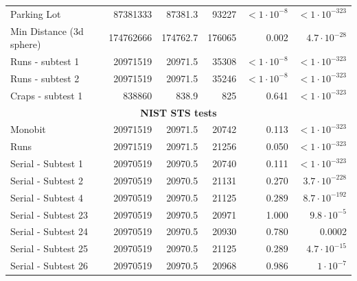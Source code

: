 \documentclass[
	digital,    %
	oneside,
	color,
	11pt,
	nocover,
	notable,
	nolof,
	nolot,
]{fithesis3}
\newcommand{\rd}{\cellcolor{red!40}}
\theoremstyle{definition}
\theoremstyle{remark}
\begin{document}
\begin{table}[H]
\begin{nomar}
{\begin{tabular}{@{}lrrrrr@{}}
Parking Lot                    & 87381333          & 87381.3       & 93227         & $<1\cdot 10^{-8}$  \rd & $<1\cdot 10^{-323}$   \rd \\
Min Distance (3d sphere)       & 174762666         & 174762.7      & 176065        & 0.002                  & $4.7 \cdot 10^{-28}$  \rd \\
Runs - subtest 1               & 20971519          & 20971.5       & 35308         & $<1\cdot 10^{-8}$  \rd & $<1\cdot 10^{-323}$   \rd \\
Runs - subtest 2               & 20971519          & 20971.5       & 35246         & $<1\cdot 10^{-8}$  \rd & $<1\cdot 10^{-323}$   \rd \\
Craps - subtest 1              & 838860            & 838.9         & 825           & 0.641                  & $<1\cdot 10^{-323}$   \rd \\ \midrule
\multicolumn{6}{c}{\textbf{NIST STS tests}} \\ \midrule
Monobit                        & 20971519          & 20971.5       & 20742         & 0.113                  & $<1\cdot 10^{-323}$   \rd \\
Runs                           & 20971519          & 20971.5       & 21256         & 0.050                  & $<1\cdot 10^{-323}$   \rd \\ 
Serial - Subtest 1             & 20970519          & 20970.5       & 20740         & 0.111                  & $<1\cdot 10^{-323}$   \rd \\
Serial - Subtest 2             & 20970519          & 20970.5       & 21131         & 0.270                  & $3.7 \cdot 10^{-228}$ \rd \\ 
Serial - Subtest 4             & 20970519          & 20970.5       & 21125         & 0.289                  & $8.7 \cdot 10^{-192}$ \rd \\ 
Serial - Subtest 23            & 20970519          & 20970.5       & 20971         & 1.000                  & $9.8 \cdot 10^{-5}$   \rd \\ 
Serial - Subtest 24            & 20970519          & 20970.5       & 20930         & 0.780                  & 0.0002                \rd \\ 
Serial - Subtest 25            & 20970519          & 20970.5       & 21125         & 0.289                  & $4.7 \cdot 10^{-15}$  \rd \\
Serial - Subtest 26            & 20970519          & 20970.5       & 20968         & 0.986                  & $1 \cdot 10^{-7}$     \rd \\

\end{tabular}}
\end{nomar}
\end{table}
\end{document}
